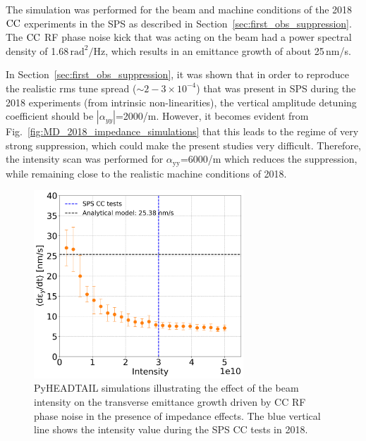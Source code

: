 The simulation was performed for the beam and machine conditions of the 2018 ${\mathrm{CC}}$ experiments in the SPS as described in Section~\ref{sec:first_obs_suppression}. The ${\mathrm{CC}}$ RF phase noise kick that was acting on the beam had a power spectral density of 1.68\,$\mathrm{rad^2/Hz}$, which results in an emittance growth of about 25\,nm/s. 

In Section~\ref{sec:first_obs_suppression}, it was shown that in order to reproduce the realistic rms tune spread ($\sim 2-3 \times 10^{-4}$) that was present in SPS during the 2018 experiments (from intrinsic non-linearities), the vertical amplitude detuning coefficient should be $| \alpha_{yy} |$=2000/m. However, it becomes evident from Fig.~\ref{fig:MD_2018_impedance_simulations} that this leads to the regime of very strong suppression, which could make the present studies very difficult. Therefore, the intensity scan was performed for $\alpha_\mathrm{yy}$=6000/m which reduces the suppression, while remaining close to the realistic machine conditions of 2018.


\begin{figure}[!h] 
    \centering         
    \includegraphics[width=0.7\textwidth]{images/Ch7/sps_270GeV_PN1e-8_400MHz_QpxQpy5e-1_ayy6000_intensity_spsCCtests.png}
        \caption{PyHEADTAIL simulations illustrating the effect of the beam intensity on the transverse emittance growth driven by CC RF phase noise in the presence of impedance effects. The blue vertical line shows the intensity value during the SPS CC tests in 2018.}
        \label{fig:study_8_intensity_scan}
 \end{figure}


